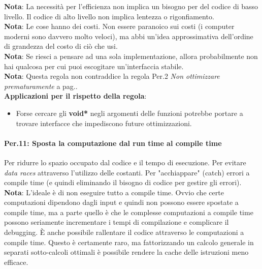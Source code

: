 \textsf{\small \textbf{Nota}: La necessità per l'efficienza non implica un bisogno per del codice di basso livello. Il codice di alto livello non implica lentezza o rigonfiamento.} \\

\textsf{\small \textbf{Nota}: Le cose hanno dei costi. Non essere paranoico sui costi (i computer moderni sono davvero molto veloci), ma abbi un'idea approssimativa dell'ordine di grandezza del costo di ciò che usi. } \\

\textsf{\small \textbf{Nota}: Se riesci a pensare ad una sola implementazione, allora probabilmente non hai qualcosa per cui puoi escogitare un'interfaccia stabile. } \\

\textsf{\small \textbf{Nota}: Questa regola non contraddice la regola Per.2 \emph{Non ottimizzare prematuramente} a pag.\pageref{Per_2}.} \\

\textsf{\small \textbf{Applicazioni per il rispetto della regola}: }

\begin{itemize}
	\item \textsf{\small Forse cercare gli \textbf{void*} negli argomenti delle funzioni potrebbe portare a trovare interfacce che impediscono future ottimizzazioni.}
\end{itemize}

\paragraph{Per.11: Sposta la computazione dal run time al compile time}

\textsf{\small Per ridurre lo spazio occupato dal codice e il tempo di esecuzione. Per evitare \emph{data races} attraverso l'utilizzo delle costanti. Per "acchiappare" (catch) errori a compile time (e quindi eliminando il bisogno di codice per gestire gli errori).} \\

\textsf{\small \textbf{Nota}: L'ideale è di non eseguire tutto a compile time. Ovvio che certe computazioni dipendono dagli input e quindi non possono essere spostate a compile time, ma a parte quello è che le complesse computazioni a compile time possono seriamente incrementare i tempi di compilazione e complicare il debugging. È anche possibile rallentare il codice attraverso le computazioni a compile time. Questo è certamente raro, ma fattorizzando un calcolo generale in separati sotto-calcoli ottimali è possibile rendere la cache delle istruzioni meno efficace.} \\

